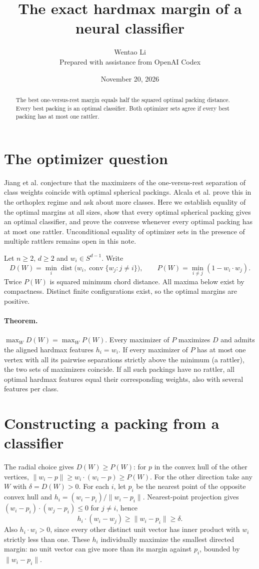 \documentclass[11pt]{article}
\title{The exact hardmax margin of a neural classifier}
\author{Wentao Li\\{\small Prepared with assistance from OpenAI Codex}}
\date{November 20, 2026}
\begin{document}
\maketitle
\begin{abstract}
The best one-versus-rest margin equals half the squared optimal packing distance. Every best packing is an optimal classifier. Both optimizer sets agree if every best packing has at most one rattler.
\end{abstract}
\section*{The optimizer question}
Jiang et al. conjecture that the maximizers of the one-versus-rest separation of class weights coincide with optimal spherical packings. Alcala et al. prove this in the orthoplex regime and ask about more classes. Here we establish equality of the optimal margins at all sizes, show that every optimal spherical packing gives an optimal classifier, and prove the converse whenever every optimal packing has at most one rattler. Unconditional equality of optimizer sets in the presence of multiple rattlers remains open in this note.

Let $n\ge2$, $d\ge2$ and $w_i\in S^{d-1}$. Write
\[
 D(W)=\min_i \operatorname{dist}\big(w_i,\operatorname{conv}\{w_j:j\ne i\}\big),
 \qquad P(W)=\min_{i\ne j}(1-w_i\cdot w_j).
\]
Twice $P(W)$ is squared minimum chord distance. All maxima below exist by compactness. Distinct finite configurations exist, so the optimal margins are positive.

\paragraph{Theorem.} $\max_W D(W)=\max_W P(W)$. Every maximizer of $P$ maximizes $D$ and admits the aligned hardmax features $h_i=w_i$. If every maximizer of $P$ has at most one vertex with all its pairwise separations strictly above the minimum (a rattler), the two sets of maximizers coincide. If all such packings have no rattler, all optimal hardmax features equal their corresponding weights, also with several features per class.

\section*{Constructing a packing from a classifier}
The radial choice gives $D(W)\ge P(W)$: for $p$ in the convex hull of the other vertices, $\|w_i-p\|\ge w_i\cdot(w_i-p)\ge P(W)$. For the other direction take any $W$ with $\delta=D(W)>0$. For each $i$, let $p_i$ be the nearest point of the opposite convex hull and $h_i=(w_i-p_i)/\|w_i-p_i\|$. Nearest-point projection gives $(w_i-p_i)\cdot(w_j-p_i)\le0$ for $j\ne i$, hence
\[
 h_i\cdot(w_i-w_j)\ge\|w_i-p_i\|\ge\delta .
\]
Also $h_i\cdot w_i>0$, since every other distinct unit vector has inner product with $w_i$ strictly less than one. These $h_i$ individually maximize the smallest directed margin: no unit vector can give more than its margin against $p_i$, bounded by $\|w_i-p_i\|$.
\end{document}
